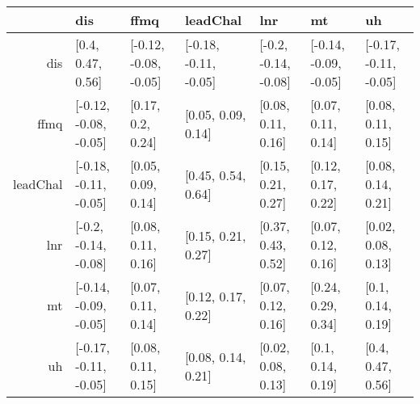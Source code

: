 \begin{table}[ht]
\centering
\begin{tabular}{rllllll}
  \hline
 & dis & ffmq & leadChal & lnr & mt & uh \\ 
  \hline
dis & [0.4, 0.47, 0.56] & [-0.12, -0.08, -0.05] & [-0.18, -0.11, -0.05] & [-0.2, -0.14, -0.08] & [-0.14, -0.09, -0.05] & [-0.17, -0.11, -0.05] \\ 
  ffmq & [-0.12, -0.08, -0.05] & [0.17, 0.2, 0.24] & [0.05, 0.09, 0.14] & [0.08, 0.11, 0.16] & [0.07, 0.11, 0.14] & [0.08, 0.11, 0.15] \\ 
  leadChal & [-0.18, -0.11, -0.05] & [0.05, 0.09, 0.14] & [0.45, 0.54, 0.64] & [0.15, 0.21, 0.27] & [0.12, 0.17, 0.22] & [0.08, 0.14, 0.21] \\ 
  lnr & [-0.2, -0.14, -0.08] & [0.08, 0.11, 0.16] & [0.15, 0.21, 0.27] & [0.37, 0.43, 0.52] & [0.07, 0.12, 0.16] & [0.02, 0.08, 0.13] \\ 
  mt & [-0.14, -0.09, -0.05] & [0.07, 0.11, 0.14] & [0.12, 0.17, 0.22] & [0.07, 0.12, 0.16] & [0.24, 0.29, 0.34] & [0.1, 0.14, 0.19] \\ 
  uh & [-0.17, -0.11, -0.05] & [0.08, 0.11, 0.15] & [0.08, 0.14, 0.21] & [0.02, 0.08, 0.13] & [0.1, 0.14, 0.19] & [0.4, 0.47, 0.56] \\ 
   \hline
\end{tabular}
\end{table}
